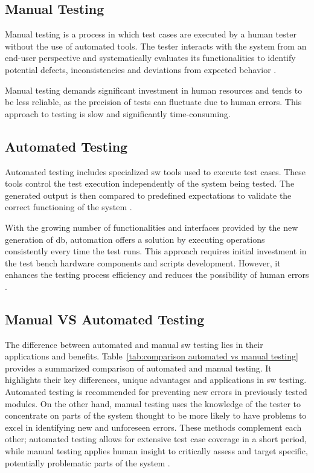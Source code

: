 \subsection{Manual Testing}

Manual testing is a process in which test cases are executed by a human tester without the use of automated tools. The tester interacts with the system from an end-user perspective and systematically evaluates its functionalities to identify potential defects, inconsistencies and deviations from expected behavior \cite{shiwangi2014}.
    
Manual testing demands significant investment in human resources and tends to be less reliable, as the precision of tests can fluctuate due to human errors. This approach to testing is slow and significantly time-consuming.


\subsection{Automated Testing}

Automated testing includes specialized \gls{sw} tools used to execute test cases. These tools control the test execution independently of the system being tested. The generated output is then compared to predefined expectations to validate the correct functioning of the system \cite{leloudas2023, shiwangi2014}.

With the growing number of functionalities and interfaces provided by the new generation of \gls{db}, automation offers a solution by executing operations consistently every time the test runs. This approach requires initial investment in the test bench hardware components and scripts development. However, it enhances the testing process efficiency and reduces the possibility of human errors \cite{shiwangi2014}.

\subsection{Manual VS Automated Testing}

The difference between automated and manual \gls{sw} testing lies in their applications and benefits. Table~\ref{tab:comparison automated vs manual testing} provides a summarized comparison of automated and manual testing. It highlights their key differences, unique advantages and applications in \gls{sw} testing. Automated testing is recommended for preventing new errors in previously tested modules. On the other hand, manual testing uses the knowledge of the tester to concentrate on parts of the system thought to be more likely to have problems to excel in identifying new and unforeseen errors. These methods complement each other; automated testing allows for extensive test case coverage in a short period, while manual testing applies human insight to critically assess and target specific, potentially problematic parts of the system \cite{shiwangi2014}. 

